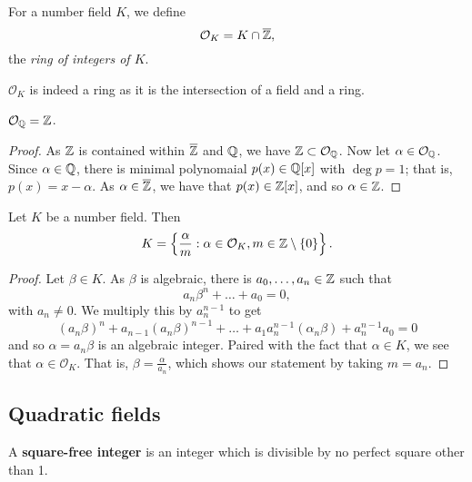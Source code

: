 
\begin{definition}
	For a number field $K$, we define
	\[
		\mathcal O_K = K \cap \overline{\mathbb{Z}},
	\]
	the \emph{ring of integers of $K$}.
\end{definition}

$\mathcal O_K$ is indeed a ring as it is the intersection of a field
and a ring.

\begin{lemma}[]
	$\mathcal O_{\mathbb{Q}} = \mathbb{Z}$.
\end{lemma}

\begin{proof}
	As $\mathbb{Z}$ is contained within $\overline{\mathbb{Z}}$ and $\mathbb{Q}$, we have
	$\mathbb{Z} \subset \mathcal O_{\mathbb{Q}}$.
	Now let $\alpha \in \mathcal O_{\mathbb{Q}}$.
	Since $\alpha \in \mathbb{Q}$, there is minimal polynomaial $p(x) \in \mathbb{Q}[x]$ 
	with $\deg p = 1$;
	that is, $p(x) = x - \alpha$.
	As $\alpha \in \overline{\mathbb{Z}}$, we have that $p(x) \in \mathbb{Z}[x]$, and so
	$\alpha \in \mathbb{Z}$.
\end{proof}

\begin{lemma}[]
	Let $K$ be a number field. Then
	\[
		K =
		\left\{ 
			\frac{\alpha}m : 
			\alpha \in \mathcal O_K, m \in \mathbb{Z} \setminus \left\{ 0 \right\} 
		\right\}.
	\]
\end{lemma}

\begin{proof}
	Let $\beta \in K$.
	As $\beta$ is algebraic, there is $a_0, \ldots, a_n \in \mathbb{Z}$
	such that
	\[
		a_n\beta^n + \ldots + a_0 = 0,
	\]
	with $a_n \neq 0$.
	We multiply this by $a_n^{n-1}$ to get
	\[
		(a_n\beta)^n
		+ a_{n-1}(a_n\beta)^{n-1}
		+ \ldots
		+ a_1 a_n^{n-1} (\alpha_n\beta) + a_n^{n-1}a_0
		= 0
	\]
	and so $\alpha = a_n\beta$ is an algebraic integer.
	Paired with the fact that $\alpha \in K$, we see
	that $\alpha \in \mathcal O_K$.
	That is, $\beta = \frac{\alpha}{a_n}$, which shows
	our statement by taking $m = a_n$.
\end{proof}

\subsection{Quadratic fields}

\begin{definition}
	A \textbf{square-free integer} is an integer which is divisible by
	no perfect square other than 1.
\end{definition}

